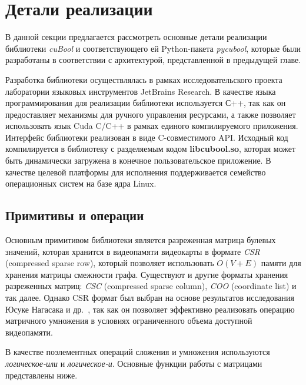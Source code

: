 \section{Детали реализации}

В данной секции предлагается рассмотреть основные детали реализации библиотеки \textit{cuBool} и соответствующего ей Python-пакета \textit{pycubool}, которые были разработаны в соответствии с архитектурой, представленной в предыдущей главе.

Разработка библиотеки осуществлялась в рамках исследовательского проекта лаборатории языковых инструментов JetBrains Research. В качестве языка программирования для реализации библиотеки используется С++, 
так как он предоставляет механизмы для ручного управления ресурсами, 
а также позволяет использовать язык Cuda C/C++ в рамках единого компилируемого приложения. 
Интерфейс библиотеки реализован в виде C-совместимого API.
Исходный код компилируется в библиотеку с разделяемым кодом \textbf{libcubool.so}, 
которая может быть динамически загружена в конечное пользовательское приложение. 
В качестве целевой платформы для исполнения поддерживается семейство операционных систем на базе ядра Linux.

\subsection{Примитивы и операции}

Основным примитивом библиотеки является разреженная матрица булевых значений, 
которая хранится в видеопамяти видеокарты в формате \textit{CSR} (compressed sparse row), 
который позволяет использовать $O(V + E)$ памяти для хранения матрицы смежности графа. 
Существуют и другие форматы хранения разреженных матриц: \textit{CSC} (compressed sparse column), \textit{COO} (coordinate list) и так далее. 
Однако CSR формат был выбран на основе результатов исследования Юсуке Нагасака и др.~\cite{inproceedings:spgemm_mem_saving_for_nvidia}, 
так как он позволяет эффективно реализовать операцию матричного умножения в условиях ограниченного объема доступной видеопамяти. 

В качестве поэлементных операций сложения и умножения используются \textit{логическое-или} и \textit{логическое-и}. 
Основные функции работы с матрицами представлены ниже.

